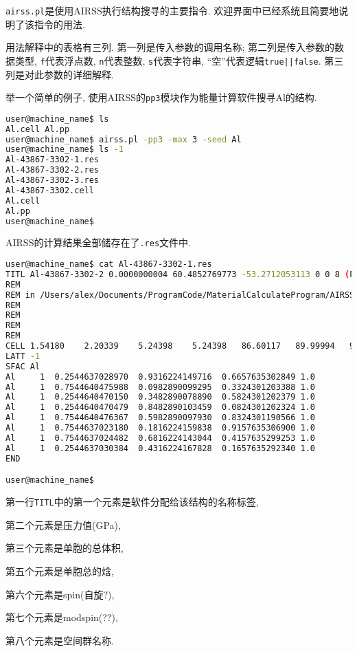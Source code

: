 \documentclass[a4paper, 10pt]{article}
\begin{document}
    \verb|airss.pl|是使用AIRSS执行结构搜寻的主要指令. 欢迎界面中已经系统且简要地说明了该指令的用法.

    用法解释中的表格有三列. 第一列是传入参数的调用名称; 第二列是传入参数的数据类型, \verb|f|代表浮点数, \verb|n|代表整数, \verb|s|代表字符串, ``空''代表逻辑\verb!true||false!. 第三列是对此参数的详细解释.

    举一个简单的例子, 使用AIRSS的\verb|pp3|模块作为能量计算软件搜寻Al的结构.

    \begin{lstlisting}[language={bash}]
user@machine_name$ ls 
Al.cell Al.pp
user@machine_name$ airss.pl -pp3 -max 3 -seed Al
user@machine_name$ ls -1
Al-43867-3302-1.res
Al-43867-3302-2.res
Al-43867-3302-3.res
Al-43867-3302.cell
Al.cell
Al.pp
user@machine_name$
    \end{lstlisting}

    AIRSS的计算结果全部储存在了\verb|.res|文件中.
    \begin{lstlisting}[language={bash}]
user@machine_name$ cat Al-43867-3302-1.res
TITL Al-43867-3302-2 0.0000000004 60.4852769773 -53.2712053113 0 0 8 (P63/mmc) n - 1
REM
REM in /Users/alex/Documents/ProgramCode/MaterialCalculateProgram/AIRSS/airss-0.9/examples/1.1
REM
REM
REM
REM
CELL 1.54180    2.20339    5.24398    5.24398   86.60117   89.99994   90.00000
LATT -1
SFAC Al 
Al     1  0.2544637028970  0.9316224149716  0.6657635302849 1.0
Al     1  0.7544640475988  0.0982890099295  0.3324301203388 1.0
Al     1  0.2544640470150  0.3482890078890  0.5824301202379 1.0
Al     1  0.2544640470479  0.8482890103459  0.0824301202324 1.0
Al     1  0.7544640476367  0.5982890097930  0.8324301190566 1.0
Al     1  0.7544637023180  0.1816224159838  0.9157635306900 1.0
Al     1  0.7544637024482  0.6816224143044  0.4157635299253 1.0
Al     1  0.2544637030384  0.4316224167828  0.1657635292340 1.0
END

user@machine_name$
    \end{lstlisting}

    第一行\verb|TITL|中的第一个元素是软件分配给该结构的名称标签,
    
    第二个元素是压力值(GPa), 
    
    第三个元素是单胞的总体积, 
    
    第五个元素是单胞总的焓, 
    
    第六个元素是spin(自旋?), 
    
    第七个元素是modspin(??), 
    
    第八个元素是空间群名称. 
    
\end{document}
